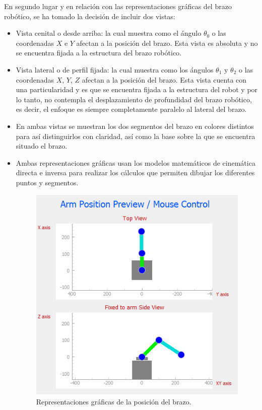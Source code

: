 En segundo lugar y en relación con las representaciones gráficas del brazo robótico, se ha tomado la decisión de incluir dos vistas:
    \begin{itemize}
        \item Vista cenital o desde arriba: la cual muestra como el ángulo $\theta_{0}$ o las coordenadas $X$ e $Y$ afectan a la posición del brazo. Esta vista es absoluta y no se encuentra fijada a la estructura del brazo robótico.
        \item Vista lateral o de perfil fijada: la cual muestra como los ángulos $\theta_{1}$ y $\theta_{2}$ o las coordenadas $X$, $Y$, $Z$ afectan a la posición del brazo. Esta vista cuenta con una particularidad y es que se encuentra fijada a la estructura del robot y por lo tanto, no contempla el desplazamiento de profundidad del brazo robótico, es decir, el enfoque es siempre completamente paralelo al lateral del brazo. 
        \item En ambas vistas se muestran los dos segmentos del brazo en colores distintos para  así distinguirlos con claridad, así como la base sobre la que se encuentra situado el brazo.
        \item Ambas representaciones gráficas usan los modelos matemáticos de cinemática directa e inversa para realizar los cálculos que permiten dibujar los diferentes puntos y segmentos.
        \begin{figure}[H]
            \centering
            \includegraphics[width=0.55\linewidth]{pictures/Views_GUI.PNG}
            \caption{Representaciones gráficas de la posición del brazo.}
            \label{fig:ui_views}
         \end{figure}
    \end{itemize}
    
